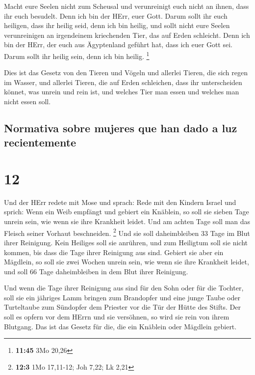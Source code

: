  Macht eure Seelen nicht zum Scheusal und verunreinigt
euch nicht an ihnen, dass ihr euch besudelt.  Denn ich
bin der HErr, euer Gott. Darum sollt ihr euch heiligen, dass ihr heilig
seid, denn ich bin heilig, und sollt nicht eure Seelen verunreinigen an
irgendeinem kriechenden Tier, das auf Erden schleicht. 
Denn ich bin der HErr, der euch aus Ägyptenland geführt hat, dass ich
euer Gott sei. Darum sollt ihr heilig sein, denn ich bin heilig.
\footnote{\textbf{11:45} 3Mo 20,26}

 Dies ist das Gesetz von den Tieren und Vögeln und
allerlei Tieren, die sich regen im Wasser, und allerlei Tieren, die auf
Erden schleichen,  dass ihr unterscheiden könnet, was
unrein und rein ist, und welches Tier man essen und welches man nicht
essen soll.

\hypertarget{normativa-sobre-mujeres-que-han-dado-a-luz-recientemente}{%
\subsection{Normativa sobre mujeres que han dado a luz
recientemente}\label{normativa-sobre-mujeres-que-han-dado-a-luz-recientemente}}

\hypertarget{section-11}{%
\section{12}\label{section-11}}

 Und der HErr redete mit Mose und sprach: 
Rede mit den Kindern Israel und sprich: Wenn ein Weib empfängt und
gebiert ein Knäblein, so soll sie sieben Tage unrein sein, wie wenn sie
ihre Krankheit leidet.  Und am achten Tage soll man das
Fleisch seiner Vorhaut beschneiden. \footnote{\textbf{12:3} 1Mo
  17,11-12; Joh 7,22; Lk 2,21}  Und sie soll daheimbleiben
33 Tage im Blut ihrer Reinigung. Kein Heiliges soll sie anrühren, und
zum Heiligtum soll sie nicht kommen, bis dass die Tage ihrer Reinigung
aus sind.  Gebiert sie aber ein Mägdlein, so soll sie zwei
Wochen unrein sein, wie wenn sie ihre Krankheit leidet, und soll 66 Tage
daheimbleiben in dem Blut ihrer Reinigung.

 Und wenn die Tage ihrer Reinigung aus sind für den Sohn
oder für die Tochter, soll sie ein jähriges Lamm bringen zum Brandopfer
und eine junge Taube oder Turteltaube zum Sündopfer dem Priester vor die
Tür der Hütte des Stifts.  Der soll es opfern vor dem
HErrn und sie versöhnen, so wird sie rein von ihrem Blutgang. Das ist
das Gesetz für die, die ein Knäblein oder Mägdlein gebiert.

